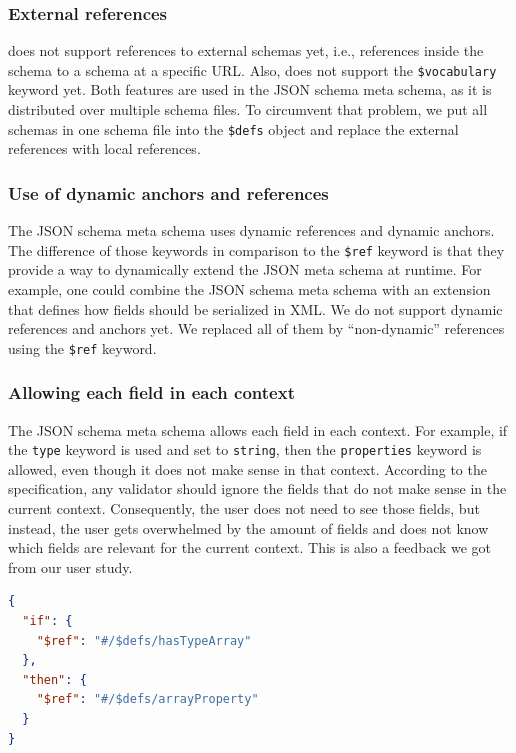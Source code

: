 \subsubsection{External references}
\toolname does not support references to external schemas yet, i.e., references inside the schema to a schema at a specific URL\@.
Also, \toolname does not support the \texttt{\$vocabulary} keyword yet.
Both features are used in the JSON schema meta schema, as it is distributed over multiple schema files.
To circumvent that problem, we put all schemas in one schema file into the \texttt{\$defs} object and replace the external references with local references.

\subsubsection{Use of dynamic anchors and references}
The JSON schema meta schema uses dynamic references and dynamic anchors.
The difference of those keywords in comparison to the \texttt{\$ref} keyword is that they provide a way to dynamically extend the JSON meta schema
at runtime.
For example, one could combine the JSON schema meta schema with an extension that defines how fields should be serialized in XML\@.
We do not support dynamic references and anchors yet.
We replaced all of them by ``non-dynamic'' references using the \texttt{\$ref} keyword.

\subsubsection{Allowing each field in each context}
The JSON schema meta schema allows each field in each context.
For example, if the \texttt{type} keyword is used and set to \texttt{string}, then the \texttt{properties} keyword is allowed,
even though it does not make sense in that context.
According to the specification, any validator should ignore the fields that do not make sense in the current context.
Consequently, the user does not need to see those fields, but instead, the user gets overwhelmed by the amount of fields
and does not know which fields are relevant for the current context.
This is also a feedback we got from our user study.

\begin{lstlisting}[language=json, firstnumber=1, caption=
    {If condition for array properties. The \texttt{hasTypeArray} is valid if the current property is of type array. The \texttt{arrayProperty} schema defines the properties of an array.}, captionpos=b]
{
  "if": {
    "$ref": "#/$defs/hasTypeArray"
  },
  "then": {
    "$ref": "#/$defs/arrayProperty"
  }
}
\end{lstlisting}\label{lst:if-then-else}


